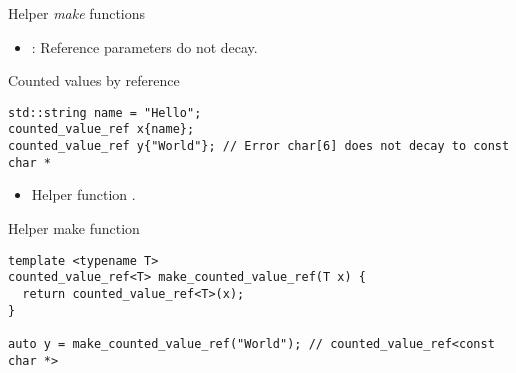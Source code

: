 \begin{frame}[t,fragile]{Helper \emph{make} functions}
\begin{itemize}
  \item {}: Reference parameters do not decay.
\end{itemize}

\begin{block}{Counted values by reference}
\begin{lstlisting}
std::string name = "Hello";
counted_value_ref x{name};
counted_value_ref y{"World"}; // Error char[6] does not decay to const char *
\end{lstlisting}
\end{block}

\begin{itemize}
  \item Helper function .
\end{itemize}

\begin{block}{Helper make function}
\begin{lstlisting}
template <typename T>
counted_value_ref<T> make_counted_value_ref(T x) {
  return counted_value_ref<T>(x);
}

auto y = make_counted_value_ref("World"); // counted_value_ref<const char *>
\end{lstlisting}
\end{block}

\end{frame}



